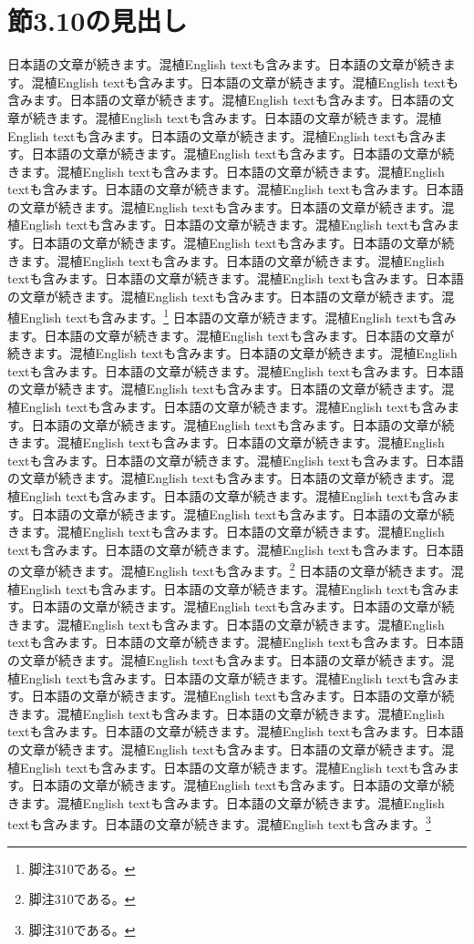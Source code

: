 \documentclass[pdflatex,book]{jlreq}
\begin{document}
\section{節3.10の見出し}
日本語の文章が続きます。混植English textも含みます。日本語の文章が続きます。混植English textも含みます。日本語の文章が続きます。混植English textも含みます。日本語の文章が続きます。混植English textも含みます。日本語の文章が続きます。混植English textも含みます。日本語の文章が続きます。混植English textも含みます。日本語の文章が続きます。混植English textも含みます。日本語の文章が続きます。混植English textも含みます。日本語の文章が続きます。混植English textも含みます。日本語の文章が続きます。混植English textも含みます。日本語の文章が続きます。混植English textも含みます。日本語の文章が続きます。混植English textも含みます。日本語の文章が続きます。混植English textも含みます。日本語の文章が続きます。混植English textも含みます。日本語の文章が続きます。混植English textも含みます。日本語の文章が続きます。混植English textも含みます。日本語の文章が続きます。混植English textも含みます。日本語の文章が続きます。混植English textも含みます。日本語の文章が続きます。混植English textも含みます。日本語の文章が続きます。混植English textも含みます。\footnote{脚注310である。}
日本語の文章が続きます。混植English textも含みます。日本語の文章が続きます。混植English textも含みます。日本語の文章が続きます。混植English textも含みます。日本語の文章が続きます。混植English textも含みます。日本語の文章が続きます。混植English textも含みます。日本語の文章が続きます。混植English textも含みます。日本語の文章が続きます。混植English textも含みます。日本語の文章が続きます。混植English textも含みます。日本語の文章が続きます。混植English textも含みます。日本語の文章が続きます。混植English textも含みます。日本語の文章が続きます。混植English textも含みます。日本語の文章が続きます。混植English textも含みます。日本語の文章が続きます。混植English textも含みます。日本語の文章が続きます。混植English textも含みます。日本語の文章が続きます。混植English textも含みます。日本語の文章が続きます。混植English textも含みます。日本語の文章が続きます。混植English textも含みます。日本語の文章が続きます。混植English textも含みます。日本語の文章が続きます。混植English textも含みます。日本語の文章が続きます。混植English textも含みます。\footnote{脚注310である。}
日本語の文章が続きます。混植English textも含みます。日本語の文章が続きます。混植English textも含みます。日本語の文章が続きます。混植English textも含みます。日本語の文章が続きます。混植English textも含みます。日本語の文章が続きます。混植English textも含みます。日本語の文章が続きます。混植English textも含みます。日本語の文章が続きます。混植English textも含みます。日本語の文章が続きます。混植English textも含みます。日本語の文章が続きます。混植English textも含みます。日本語の文章が続きます。混植English textも含みます。日本語の文章が続きます。混植English textも含みます。日本語の文章が続きます。混植English textも含みます。日本語の文章が続きます。混植English textも含みます。日本語の文章が続きます。混植English textも含みます。日本語の文章が続きます。混植English textも含みます。日本語の文章が続きます。混植English textも含みます。日本語の文章が続きます。混植English textも含みます。日本語の文章が続きます。混植English textも含みます。日本語の文章が続きます。混植English textも含みます。日本語の文章が続きます。混植English textも含みます。\footnote{脚注310である。}
\end{document}
